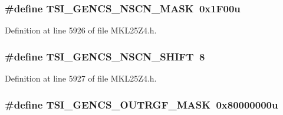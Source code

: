 \subsubsection[{\texorpdfstring{T\+S\+I\+\_\+\+G\+E\+N\+C\+S\+\_\+\+N\+S\+C\+N\+\_\+\+M\+A\+SK}{TSI_GENCS_NSCN_MASK}}]{\setlength{\rightskip}{0pt plus 5cm}\#define T\+S\+I\+\_\+\+G\+E\+N\+C\+S\+\_\+\+N\+S\+C\+N\+\_\+\+M\+A\+SK~0x1\+F00u}\hypertarget{group___t_s_i___register___masks_ga3a420e0ae200374eca1a185b535cc0ba}{}\label{group___t_s_i___register___masks_ga3a420e0ae200374eca1a185b535cc0ba}


Definition at line 5926 of file M\+K\+L25\+Z4.\+h.

\subsubsection[{\texorpdfstring{T\+S\+I\+\_\+\+G\+E\+N\+C\+S\+\_\+\+N\+S\+C\+N\+\_\+\+S\+H\+I\+FT}{TSI_GENCS_NSCN_SHIFT}}]{\setlength{\rightskip}{0pt plus 5cm}\#define T\+S\+I\+\_\+\+G\+E\+N\+C\+S\+\_\+\+N\+S\+C\+N\+\_\+\+S\+H\+I\+FT~8}\hypertarget{group___t_s_i___register___masks_gab90732bc69449d59a0fc0f3c208caf21}{}\label{group___t_s_i___register___masks_gab90732bc69449d59a0fc0f3c208caf21}


Definition at line 5927 of file M\+K\+L25\+Z4.\+h.

\subsubsection[{\texorpdfstring{T\+S\+I\+\_\+\+G\+E\+N\+C\+S\+\_\+\+O\+U\+T\+R\+G\+F\+\_\+\+M\+A\+SK}{TSI_GENCS_OUTRGF_MASK}}]{\setlength{\rightskip}{0pt plus 5cm}\#define T\+S\+I\+\_\+\+G\+E\+N\+C\+S\+\_\+\+O\+U\+T\+R\+G\+F\+\_\+\+M\+A\+SK~0x80000000u}\hypertarget{group___t_s_i___register___masks_gae0670e2e8c0eb55717171acb5a2bebfe}{}\label{group___t_s_i___register___masks_gae0670e2e8c0eb55717171acb5a2bebfe}


